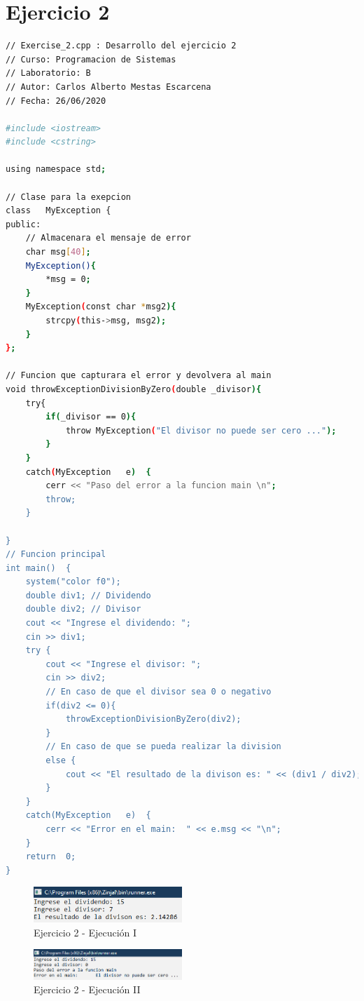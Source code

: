 \documentclass[12pt]{article}
\begin{document}
\clearpage
\newpage

\section{Ejercicio 2}

\begin{lstlisting}[language=bash,frame=single,style=CStyle]
// Exercise_2.cpp : Desarrollo del ejercicio 2
// Curso: Programacion de Sistemas
// Laboratorio: B
// Autor: Carlos Alberto Mestas Escarcena
// Fecha: 26/06/2020

#include <iostream>
#include <cstring>	

using namespace std;

// Clase para la exepcion
class	MyException	{
public:
	// Almacenara el mensaje de error
	char msg[40];
	MyException(){
		*msg = 0;	
	}
	MyException(const char *msg2){
		strcpy(this->msg, msg2);
	}
};

// Funcion que capturara el error y devolvera al main
void throwExceptionDivisionByZero(double _divisor){
	try{
		if(_divisor == 0){
			throw MyException("El divisor no puede ser cero ...");
		}
	}
	catch(MyException	e)	{
		cerr <<	"Paso del error a la funcion main \n";
		throw;
	}
	
}
// Funcion principal
int	main()	{
	system("color f0");
	double div1; // Dividendo
	double div2; // Divisor
	cout << "Ingrese el dividendo: ";
	cin >> div1;
	try	{
		cout << "Ingrese el divisor: ";
		cin >> div2;
		// En caso de que el divisor sea 0 o negativo
		if(div2 <= 0){
			throwExceptionDivisionByZero(div2);
		}
		// En caso de que se pueda realizar la division
		else {
			cout << "El resultado de la divison es: " << (div1 / div2);
		}
	}
	catch(MyException	e)	{
		cerr <<	"Error en el main:	" << e.msg << "\n";
	}
	return	0;
}
\end{lstlisting}

\begin{figure}[h]
    \centering
    \includegraphics[width=0.5\textwidth]{images/Capture02A.PNG}
    \caption{Ejercicio 2 - Ejecución I}
\end{figure}

\begin{figure}[h]
    \centering
    \includegraphics[width=0.5\textwidth]{images/Capture02B.PNG}
    \caption{Ejercicio 2 - Ejecución II}
\end{figure}
\end{document}
